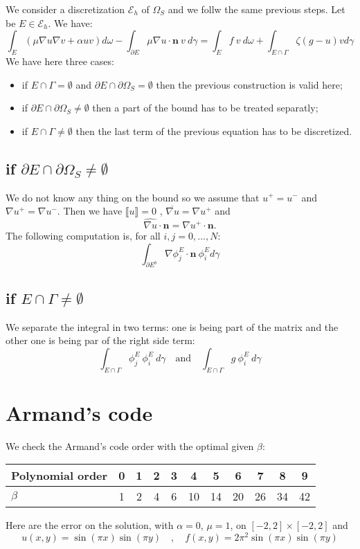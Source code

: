 \documentclass[a4paper,10pt,draft]{article}
\begin{document}
We consider a discretization $\mathcal{E}_h$ of $\Omega_S$ and we follw the same previous steps. 
Let be $E \in \mathcal{E}_h$. We have:
\begin{equation*}
\int_{E} (\mu \nabla u \nabla v + \alpha uv) d\omega - \int_{\partial E} \mu \nabla u \cdot 
\mathbf{n} \ v\ d\gamma = \int_{E}  f\ v\ d\omega + \int_{E \cap \Gamma} \zeta (g-u)v d\gamma
\end{equation*}
We have here three cases:
\begin{itemize}
 \item if $E \cap \Gamma = \emptyset$ and $\partial E \cap \partial \Omega_S = \emptyset$ then the 
previous construction is valid here;
\item if $\partial E \cap \partial \Omega_S \neq \emptyset$ then a part of the bound has to be 
treated separatly;
\item if $E \cap \Gamma \neq \emptyset$ then the last term of the previous equation has to be 
discretized.
\end{itemize}

\subsection{if $\partial E \cap \partial \Omega_S \neq \emptyset$}
We do not know any thing on the bound so we assume that $u^+ = u^-$ and $\nabla u^+ = \nabla u^-$. 
Then we have $\llbracket u \rrbracket = 0$ , $\overline{\nabla u} = \nabla u^+$ and
$$
\widehat{\nabla u} \cdot \mathbf{n} = \nabla u^+ \cdot \mathbf{n}.
$$
The following computation is, for all $i,j=0,\dots,N$:
$$
\int_{\partial E^b} \nabla \phi_j^E \cdot \mathbf{n} \ \phi_i^E d\gamma
$$

\subsection{if $E \cap \Gamma \neq \emptyset$}
We separate the integral in two terms: one is being part of the matrix and the other one is being 
par of the right side term:
$$
\int_{E \cap \Gamma} \phi_j^E \ \phi_i^E \ d\gamma 
\quad \text{and} \quad
\int_{E \cap \Gamma} g \ \phi_i^E \ d\gamma 
$$


\section{Armand's code}

We check the Armand's code order with the optimal given $\beta$:
\begin{table}[hp!]
\centering
 \begin{tabular}{|l|c|c|c|c|c|c|c|c|c|c|}
 \hline
 Polynomial order & 0 & 1 & 2 & 3 & 4 & 5 & 6 & 7 & 8 & 9 \\\hline
 $\beta$  & 1 & 2 & 4 & 6 & 10 & 14 & 20 & 26 & 34 & 42\\\hline
 \end{tabular}
\end{table}

Here are the error on the solution, with $\alpha = 0$, $\mu = 1$, on $[-2,2]\times[-2,2]$ and
$$
u(x,y) = \sin (\pi x) \sin(\pi y) \quad, \quad f(x,y) = 2\pi^2 \sin (\pi x) \sin(\pi y)
$$
\end{document}
